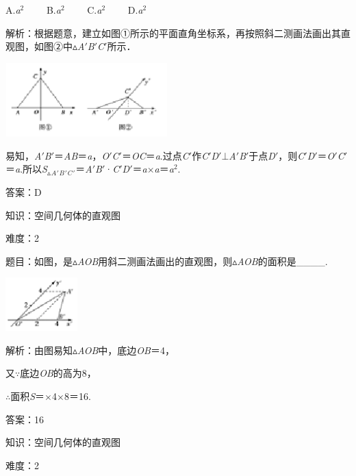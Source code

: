 \documentclass{article} %
\begin{document}
A.\textit{a}${}^{2}$　　 B.\textit{a}${}^{2}$　　 C.\textit{a}${}^{2}$　　 D.\textit{a}${}^{2}$

解析：根据题意，建立如图①所示的平面直角坐标系，再按照斜二测画法画出其直观图，如图②中$\mathrm{\vartriangle}$\textit{A}$'$\textit{B}$'$\textit{C}$'$所示．

\includegraphics*[width=2.47in, height=1.12in, keepaspectratio=false]{image56}

易知，\textit{A}$'$\textit{B}$'$＝\textit{AB}＝\textit{a}，\textit{O}$'$\textit{C}$'$＝\textit{OC}＝\textit{a}.过点\textit{C}$'$作\textit{C}$'$\textit{D}$'$$\mathrm{\bot}$\textit{A}$'$\textit{B}$'$于点\textit{D}$'$，则\textit{C}$'$\textit{D}$'$＝\textit{O}$'$\textit{C}$'$＝\textit{a}.所以\textit{S}${}_{\vartriangle }$\textit{${}_{A}$}${}_{\mathrm{\prime }}$\textit{${}_{B}$}${}_{\mathrm{\prime }}$\textit{${}_{C}$}${}_{\mathrm{\prime }}$＝\textit{A}$'$\textit{B}$'$·\textit{C}$'$\textit{D}$'$＝\textit{a}$\mathrm{\times}$\textit{a}＝\textit{a}${}^{2}$.

答案：D

知识：空间几何体的直观图

难度：2

题目：如图，是$\mathrm{\vartriangle}$\textit{AOB}用斜二测画法画出的直观图，则$\mathrm{\vartriangle}$\textit{AOB}的面积是\_\_\_\_.



\includegraphics*[width=1.10in, height=0.81in, keepaspectratio=false]{image57}

解析：由图易知$\mathrm{\vartriangle}$\textit{AOB}中，底边\textit{OB}＝4，

又$\mathrm{\because}$底边\textit{OB}的高为8，

$\mathrm{\therefore}$面积\textit{S}＝$\mathrm{\times}$4$\mathrm{\times}$8＝16.

答案：16

知识：空间几何体的直观图

难度：2
\end{document}
